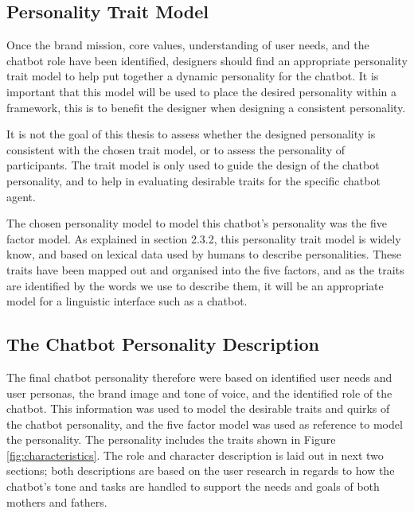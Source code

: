 \vspace{5mm}

    \subsection{Personality Trait Model}
    Once the brand mission, core values, understanding of user needs, and the chatbot role have been identified, designers should find an appropriate personality trait model to help put together a dynamic personality for the chatbot. It is important that this model will be used to place the desired personality within a framework, this is to benefit the designer when designing a consistent personality. 
    
    It is not the goal of this thesis to assess whether the designed personality is consistent with the chosen trait model, or to assess the personality of participants. The trait model is only used to guide the design of the chatbot personality, and to help in evaluating desirable traits for the specific chatbot agent. 
    
    The chosen personality model to model this chatbot's personality was the five factor model. As explained in section 2.3.2, this personality trait model is widely know, and based on lexical data used by humans to describe personalities. These traits have been mapped out and organised into the five factors, and as the traits are identified by the words we use to describe them, it will be an appropriate model for a linguistic interface such as a chatbot.
    
\vspace{5mm}

    \subsection{The Chatbot Personality Description}
    The final chatbot personality therefore were based on identified user needs and user personas, the brand image and tone of voice, and the identified role of the chatbot. This information was used to model the desirable traits and quirks of the chatbot personality, and the five factor model was used as reference to model the personality. The personality includes the traits shown in Figure \ref{fig:characteristics}. The role and character description is laid out in next two sections; both descriptions are based on the user research in regards to how the chatbot's tone and tasks are handled to support the needs and goals of both mothers and fathers.
    
